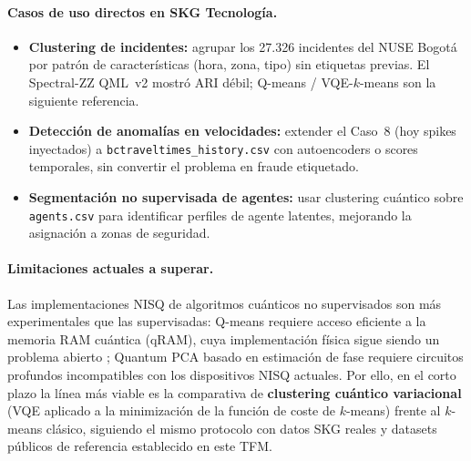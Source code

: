 \paragraph{Casos de uso directos en SKG Tecnología.}
\begin{itemize}
  \item \textbf{Clustering de incidentes:} agrupar los 27.326 incidentes del NUSE Bogotá por patrón de características (hora, zona, tipo) sin etiquetas previas. El Spectral-ZZ QML~v2 mostró ARI débil; Q-means / VQE-$k$-means son la siguiente referencia.
  \item \textbf{Detección de anomalías en velocidades:} extender el Caso~8 (hoy spikes inyectados) a \texttt{bctraveltimes\_history.csv} con autoencoders o scores temporales, sin convertir el problema en fraude etiquetado.
  \item \textbf{Segmentación no supervisada de agentes:} usar clustering cuántico sobre \texttt{agents.csv} para identificar perfiles de agente latentes, mejorando la asignación a zonas de seguridad.
\end{itemize}

\paragraph{Limitaciones actuales a superar.}
Las implementaciones NISQ de algoritmos cuánticos no supervisados son más experimentales que las supervisadas: Q-means requiere acceso eficiente a la memoria RAM cuántica (qRAM), cuya implementación física sigue siendo un problema abierto \citep{biamonte2017}; Quantum PCA basado en estimación de fase requiere circuitos profundos incompatibles con los dispositivos NISQ actuales. Por ello, en el corto plazo la línea más viable es la comparativa de \textbf{clustering cuántico variacional} (VQE aplicado a la minimización de la función de coste de $k$-means) frente al $k$-means clásico, siguiendo el mismo protocolo con datos SKG reales y datasets públicos de referencia establecido en este TFM.

